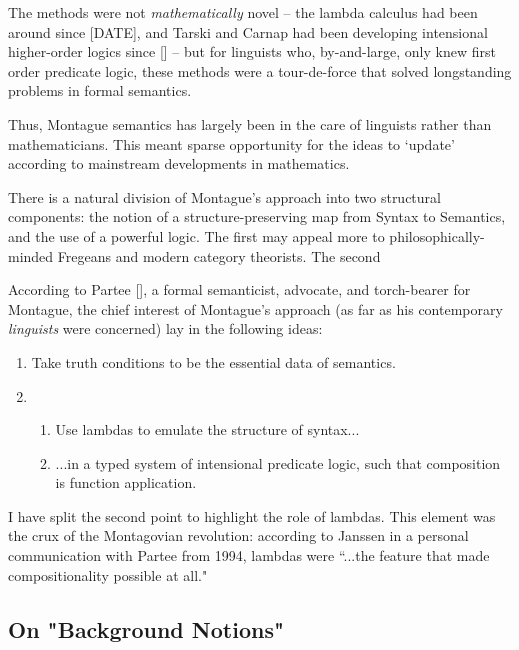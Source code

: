 The methods were not \emph{mathematically} novel -- the lambda calculus had been around since [DATE], and Tarski and Carnap had been developing intensional higher-order logics since [] -- but for linguists who, by-and-large, only knew first order predicate logic, these methods were a tour-de-force that solved longstanding problems in formal semantics.

Thus, Montague semantics has largely been in the care of linguists rather than mathematicians. This meant sparse opportunity for the ideas to `update' according to mainstream developments in mathematics.


There is a natural division of Montague's approach into two structural components: the notion of a structure-preserving map from Syntax to Semantics, and the use of a powerful logic. The first may appeal more to philosophically-minded Fregeans and modern category theorists. The second

According to Partee [], a formal semanticist, advocate, and torch-bearer for Montague, the chief interest of Montague's approach (as far as his contemporary \emph{linguists} were concerned) lay in the following ideas:

\begin{enumerate}
\item{Take truth conditions to be the essential data of semantics.}
\item{
\begin{enumerate}
\item{Use lambdas to emulate the structure of syntax...}
\item{...in a typed system of intensional predicate logic, such that composition is function application.}
\end{enumerate}}
\end{enumerate}

I have split the second point to highlight the role of lambdas. This element was the crux of the Montagovian revolution: according to Janssen in a personal communication with Partee from 1994, lambdas were ``...the feature that made compositionality possible at all."

\subsection{On "Background Notions"}


